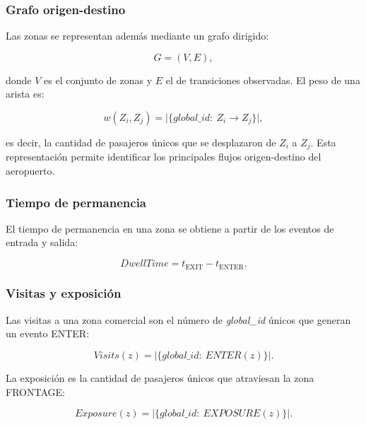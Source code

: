 \documentclass[12pt,letterpaper]{article}
\begin{document}
\subsubsection{Grafo origen-destino}

Las zonas se representan además mediante un grafo dirigido:

\begin{equation}
G=(V,E),
\end{equation}

donde $V$ es el conjunto de zonas y $E$ el de transiciones observadas. El
peso de una arista es:

\begin{equation}
w(Z_i,Z_j)
=
\big|\{global\_id:\ Z_i\rightarrow Z_j\}\big|,
\end{equation}

es decir, la cantidad de pasajeros únicos que se desplazaron de $Z_i$ a
$Z_j$. Esta representación permite identificar los principales flujos
origen-destino del aeropuerto.

\subsubsection{Tiempo de permanencia}

El tiempo de permanencia en una zona se obtiene a partir de los eventos
de entrada y salida:

\begin{equation}
DwellTime =
t_{\text{EXIT}}
-
t_{\text{ENTER}}.
\end{equation}

\subsubsection{Visitas y exposición}

Las visitas a una zona comercial son el número de \textit{global\_id}
únicos que generan un evento ENTER:

\begin{equation}
Visits(z)=
\big|\{global\_id:\ ENTER(z)\}\big|.
\end{equation}

La exposición es la cantidad de pasajeros únicos que atraviesan la zona
FRONTAGE:

\begin{equation}
Exposure(z)=
\big|\{global\_id:\ EXPOSURE(z)\}\big|.
\end{equation}
\end{document}
